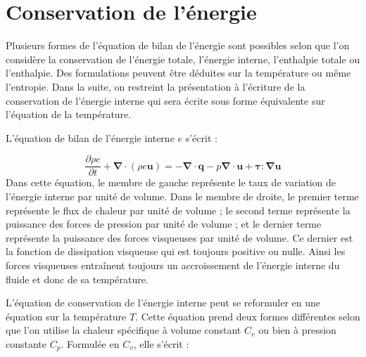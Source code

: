 \newpage
\chapter{Conservation de l'\'energie}
Plusieurs formes de l'\'equation de bilan de l'\'energie sont possibles
selon que l'on consid\`ere la conservation de l'\'energie totale, l'\'energie
interne, l'enthalpie totale ou l'enthalpie. Des formulations peuvent
\^etre d\'eduites sur la temp\'erature ou m\^eme l'entropie. Dans la suite,
on restreint la pr\'esentation \`a l'\'ecriture de la conservation de l'\'energie
interne qui sera \'ecrite sous forme \'equivalente sur l'\'equation de la
temp\'erature.

L'\'equation de bilan de l'\'energie interne $e$ s'\'ecrit \cite[p. 126]{Book_Candel}
:

\begin{equation}
\frac{\partial\rho e}{\partial t}+\boldsymbol{\nabla}\cdot(\rho e\mathbf{u})=-\boldsymbol{\nabla}\cdot\mathbf{q}-p\boldsymbol{\nabla}\cdot\mathbf{u}+\boldsymbol{\tau}:\boldsymbol{\nabla}\mathbf{u}\label{eq:Energie}
\end{equation}
Dans cette \'equation, le membre de gauche repr\'esente le taux de variation
de l'\'energie interne par unit\'e de volume. Dans le membre de droite,
le premier terme repr\'esente le flux de chaleur par unit\'e de volume
; le second terme repr\'esente la puissance des forces de pression par
unit\'e de volume ; et le dernier terme repr\'esente la puissance des
forces visqueuses par unit\'e de volume. Ce dernier est la fonction
de dissipation visqueuse qui est toujours positive ou nulle. Ainsi
les forces visqueuses entra\^inent toujours un accroissement de l'\'energie
interne du fluide et donc de sa temp\'erature.

L'\'equation de conservation de l'\'energie interne peut se reformuler
en une \'equation sur la temp\'erature $T$. Cette \'equation prend deux
formes diff\'erentes selon que l'on utilise la chaleur sp\'ecifique \`a
volume constant $C_{v}$ ou bien \`a pression constante $C_{p}$. Formul\'ee
en $C_{v}$, elle s'\'ecrit :

